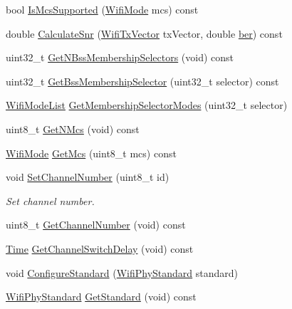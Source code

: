 \begin{DoxyCompactItemize}
bool \hyperlink{classns3_1_1WifiPhy_a98ebea3fc93dd29a55303b166c271ef5}{Is\+Mcs\+Supported} (\hyperlink{classns3_1_1WifiMode}{Wifi\+Mode} mcs) const 
\item 
double \hyperlink{classns3_1_1WifiPhy_af2f9f93508eab3a8ffb2d2a2088d732a}{Calculate\+Snr} (\hyperlink{classns3_1_1WifiTxVector}{Wifi\+Tx\+Vector} tx\+Vector, double \hyperlink{lte__ue__measurements_8m_a8320b665cd9f5639cb929c78d5a41af7}{ber}) const 
\item 
uint32\+\_\+t \hyperlink{classns3_1_1WifiPhy_a0d5b168ddf02c7df51f83004454232c2}{Get\+N\+Bss\+Membership\+Selectors} (void) const 
\item 
uint32\+\_\+t \hyperlink{classns3_1_1WifiPhy_a3b6817c0140f083292ef70333d1c78c3}{Get\+Bss\+Membership\+Selector} (uint32\+\_\+t selector) const 
\item 
\hyperlink{namespacens3_abceecb3f813d2b4af697068f25085024}{Wifi\+Mode\+List} \hyperlink{classns3_1_1WifiPhy_a364d5c384738aee9227c816d9d4456da}{Get\+Membership\+Selector\+Modes} (uint32\+\_\+t selector)
\item 
uint8\+\_\+t \hyperlink{classns3_1_1WifiPhy_aede1b3de380510e387aaafcfda7a0db0}{Get\+N\+Mcs} (void) const 
\item 
\hyperlink{classns3_1_1WifiMode}{Wifi\+Mode} \hyperlink{classns3_1_1WifiPhy_a6a8740a6fbb7ff618c80e0a0867467fd}{Get\+Mcs} (uint8\+\_\+t mcs) const 
\item 
void \hyperlink{classns3_1_1WifiPhy_a2d13cf6ae4c185cae8516516afe4a32a}{Set\+Channel\+Number} (uint8\+\_\+t id)
\begin{DoxyCompactList}\small\item\em Set channel number. \end{DoxyCompactList}\item 
uint8\+\_\+t \hyperlink{classns3_1_1WifiPhy_a5cf0ccf06109ace61db51c83e91b7e8d}{Get\+Channel\+Number} (void) const 
\item 
\hyperlink{classns3_1_1Time}{Time} \hyperlink{classns3_1_1WifiPhy_a87aceab44ed843359bdaab5ea8cf4ad3}{Get\+Channel\+Switch\+Delay} (void) const 
\item 
void \hyperlink{classns3_1_1WifiPhy_aeafbea9bd8c1ae20f85584f55d868d23}{Configure\+Standard} (\hyperlink{group__wifi_ga1299834f4e1c615af3ca738033b76a49}{Wifi\+Phy\+Standard} standard)
\item 
\hyperlink{group__wifi_ga1299834f4e1c615af3ca738033b76a49}{Wifi\+Phy\+Standard} \hyperlink{classns3_1_1WifiPhy_af33f60586f8e0bd1763b863e7ce193b2}{Get\+Standard} (void) const 
\item 

\end{DoxyCompactItemize}
